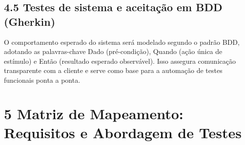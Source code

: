 \begin{apendicesenv}
\subsection*{4.5 Testes de sistema e aceitação em BDD (Gherkin)}

O comportamento esperado do sistema será modelado segundo o padrão BDD, adotando as palavras-chave Dado (pré-condição), Quando (ação única de estímulo) e Então (resultado esperado observável). Isso assegura comunicação transparente com a cliente e serve como base para a automação de testes funcionais ponta a ponta.

\section*{5 Matriz de Mapeamento: Requisitos e Abordagem de Testes}


\end{apendicesenv}
